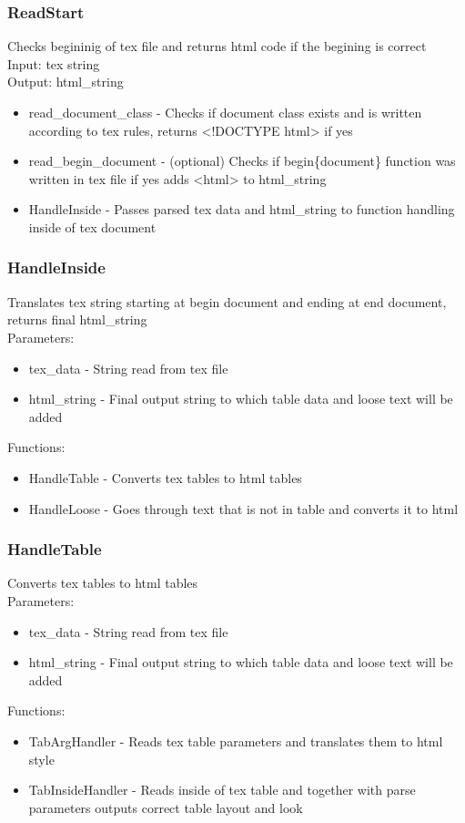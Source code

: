 \documentclass[12pt]{article}
\begin{document}
\subsubsection{ReadStart}
Checks begininig of tex file and returns html code if the begining is correct \\ 
Input: tex string \\ 
Output: html\_string

\begin{itemize}
\item read\_document\_class - Checks if document class exists and is written according to tex rules, returns <!DOCTYPE html> if yes
\item read\_begin\_document - (optional) Checks if begin\{document\} function was written in tex file if yes adds <html> to html\_string
\item HandleInside - Passes parsed tex data and html\_string to function handling inside of tex document 
\end{itemize}

\subsubsection{HandleInside}
Translates tex string starting at begin document and ending at end document, returns final html\_string \\ 
Parameters: \\ 
\begin{itemize}
\item tex\_data - String read from tex file
\item html\_string - Final output string to which table data and loose text will be added 
\end{itemize}
Functions: 
\begin{itemize}
    \item HandleTable - Converts tex tables to html tables
    \item HandleLoose - Goes through text that is not in table and converts it to html  
\end{itemize}

\subsubsection{HandleTable}
Converts tex tables to html tables \\ 
Parameters: \\ 
\begin{itemize}
\item tex\_data - String read from tex file
\item html\_string - Final output string to which table data and loose text will be added 
\end{itemize}
Functions: 
\begin{itemize}
    \item TabArgHandler - Reads tex table parameters and translates them to html style
    \item TabInsideHandler - Reads inside of tex table and together with parse parameters outputs correct table layout and look
\end{itemize}
\end{document}
